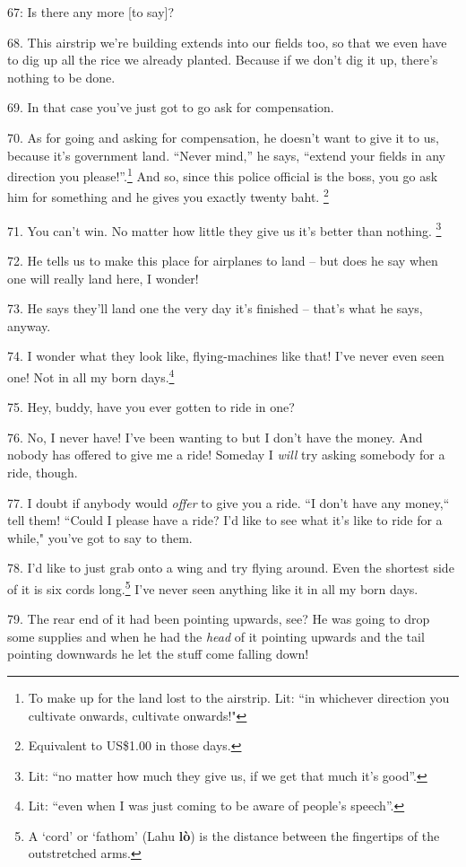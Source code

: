  67: Is there any more [to say]?

68. This airstrip we're building extends into our fields too, so that we even have
to dig up all the rice we already planted. Because if we don't dig it up, there's
nothing to be done.

69. In that case you've just got to go ask for compensation.

70. As for going and asking for compensation, he doesn't want to give it to us,
because it's government land. ``Never mind,'' he says, ``extend
your fields in any direction you please!''.\footnote{To make up for the land lost to the airstrip. Lit: ``in whichever direction you cultivate onwards, cultivate onwards!"} And so, since this police official
is the boss, you go ask him for something and he gives you exactly twenty baht.
\footnote{Equivalent to US\$1.00 in those days.}

71. You can't win. No matter how little they give us it's better than nothing.
\footnote{Lit: ``no matter how much they give us, if we get that much it's good''.}

72. He tells us to make this place for airplanes to land -- but does he say when
one will really land here, I wonder!

73. He says they'll land one the very day it's finished -- that's what he says,
anyway.

74. I wonder what they look like, flying-machines like that! I've never even seen
one! Not in all my born days.\footnote{Lit: ``even when I was just coming to be aware of people's speech''.}

75. Hey, buddy, have you ever gotten to ride in one?

76. No, I never have! I've been wanting to but I don't have the money. And nobody
has offered to give me a ride! Someday I \textit{will} try asking somebody for
a ride, though.

77. I doubt if anybody would \textit{offer} to give you a ride. ``I don't
have any money,`` tell them! ``Could I please have a ride? I'd
like to see what it's like to ride for a while," you've got to say to
them.

78. I'd like to just grab onto a wing and try flying around. Even the shortest
side of it is six cords long.\footnote{A `cord' or `fathom' (Lahu \textbf{lò}) is the distance between the fingertips of the outstretched arms.} I've never seen anything like it in all my born
days.

79. The rear end of it had been pointing upwards, see? He was going to drop some
supplies and when he had the \textit{head} of it pointing upwards and the tail
pointing downwards he let the stuff come falling down!


